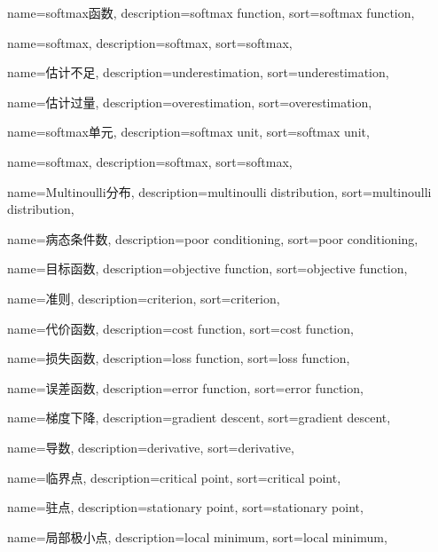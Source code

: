 {
  name=softmax函数,
  description={softmax function},
  sort={softmax function},
}

{
  name=softmax,
  description={softmax},
  sort={softmax},
}

{
  name=估计不足,
  description={underestimation},
  sort={underestimation},
}

{
  name=估计过量,
  description={overestimation},
  sort={overestimation},
}

{
  name=softmax单元,
  description={softmax unit},
  sort={softmax unit},
}

{
  name=softmax,
  description={softmax},
  sort={softmax},
}

{
  name=Multinoulli分布,
  description={multinoulli distribution},
  sort={multinoulli distribution},
}

{
  name=病态条件数,
  description={poor conditioning},
  sort={poor conditioning},
}

{
  name=目标函数,
  description={objective function},
  sort={objective function},
}

{
  name=准则,
  description={criterion},
  sort={criterion},
}

{
  name=代价函数,
  description={cost function},
  sort={cost function},
}

{
  name=损失函数,
  description={loss function},
  sort={loss function},
}

{
  name=误差函数,
  description={error function},
  sort={error function},
}

{
  name=梯度下降,
  description={gradient descent},
  sort={gradient descent},
}

{
  name=导数,
  description={derivative},
  sort={derivative},
}

{
  name=临界点,
  description={critical point},
  sort={critical point},
}

{
  name=驻点,
  description={stationary point},
  sort={stationary point},
}

{
  name=局部极小点,
  description={local minimum},
  sort={local minimum},
}

